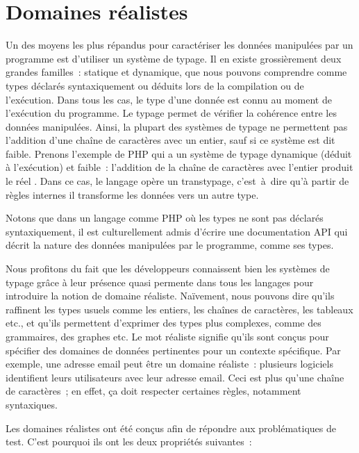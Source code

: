 \section{Domaines réalistes}
\label{section:language:realdoms}

Un des moyens les plus répandus pour caractériser les données manipulées par un
programme est d'utiliser un système de {\strong typage}. Il en existe
grossièrement deux grandes familles~: {\strong statique} et {\strong dynamique},
que nous pouvons comprendre comme types déclarés syntaxiquement ou déduits lors
de la compilation ou de l'exécution. Dans tous les cas, le type d'une donnée est
connu au moment de l'{\strong exécution} du programme. Le typage permet de
{\strong vérifier} la cohérence entre les données manipulées. Ainsi, la plupart
des systèmes de typage ne permettent pas l'addition d'une chaîne de caractères
avec un entier, sauf si ce système est dit {\strong faible}. Prenons l'exemple
de PHP qui a un système de typage dynamique (déduit à l'exécution) et faible~:
l'addition de la chaîne de caractères  avec l'entier 
produit le réel . Dans ce cas, le langage opère un transtypage,
c'est~à~dire qu'à partir de règles internes il transforme les données vers un
autre type.

Notons que dans un langage comme PHP où les types ne sont pas déclarés
syntaxiquement, il est culturellement admis d'écrire une documentation API qui
décrit la nature des données manipulées par le programme, comme ses types.

Nous profitons du fait que les développeurs connaissent bien les systèmes de
typage grâce à leur présence quasi permente dans tous les langages pour
introduire la notion de {\strong domaine réaliste}. Naïvement, nous pouvons dire
qu'ils raffinent les types usuels comme les entiers, les chaînes de caractères,
les tableaux etc., et qu'ils permettent d'exprimer des types plus complexes,
comme des grammaires, des graphes etc. Le mot {\strong réaliste} signifie qu'ils
sont conçus pour spécifier des domaines de données {\strong pertinentes} pour un
contexte {\strong spécifique}. Par exemple, une adresse email peut être un
domaine réaliste~: plusieurs logiciels identifient leurs utilisateurs avec leur
adresse email. Ceci est plus qu'une chaîne de caractères~; en effet, ça doit
respecter certaines règles, notamment syntaxiques.

Les domaines réalistes ont été conçus afin de répondre aux problématiques de
test. C'est pourquoi ils ont les deux propriétés suivantes~:

